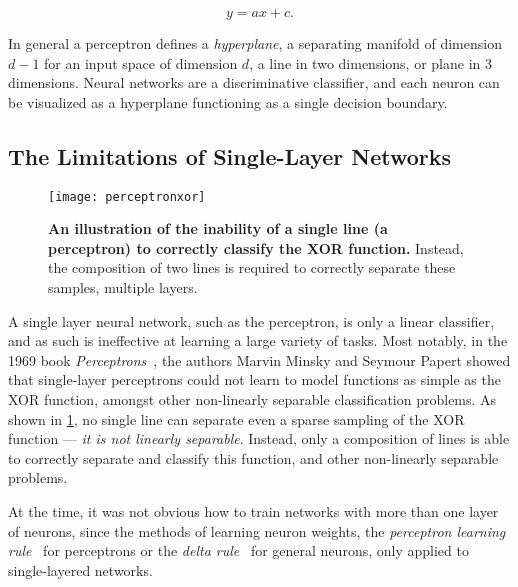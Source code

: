 \documentclass[thesis]{subfiles}
\begin{document}
\begin{equation}
y = a x + c.
\end{equation}

In general a perceptron defines a \emph{hyperplane}, a separating manifold of dimension $d - 1$ for an input space of dimension $d$, a line in two dimensions, or plane in 3 dimensions. Neural networks are a discriminative classifier, and each neuron can be visualized as a hyperplane functioning as a single decision boundary.

\subsection{The Limitations of Single-Layer Networks}
\begin{figure}[tbp]
\centering
\texttt{[image: perceptronxor]}
\caption[An illustration of the inability of a single line to correctly classify the XOR function.]{\textbf{An illustration of the inability of a single line (\ie{}a perceptron) to correctly classify the XOR function.} Instead, the composition of two lines is required to correctly separate these samples, \ie{}multiple layers.}
\label{fig:perceptronxor}
\end{figure}
A single layer neural network, such as the perceptron, is only a linear classifier, and as such is ineffective at learning a large variety of tasks. Most notably, in the 1969 book \emph{Perceptrons}~\citep{minsky1988perceptrons}, the authors Marvin Minsky and Seymour Papert showed that single-layer perceptrons could not learn to model functions as simple as the XOR function, amongst other non-linearly separable classification problems. As shown in \cref{fig:perceptronxor}, no single line can separate even a sparse sampling of the XOR function --- \ie\emph{it is not linearly separable}. Instead, only a composition of lines is able to correctly separate and classify this function, and other non-linearly separable problems.

At the time, it was not obvious how to train networks with more than one layer of neurons, since the methods of learning neuron weights, the \emph{perceptron learning rule}~\citep{rosenblatt1961principles} for perceptrons or the \emph{delta rule}~\citep{widrow1960adaptive} for general neurons, only applied to single-layered networks. %
\end{document}
